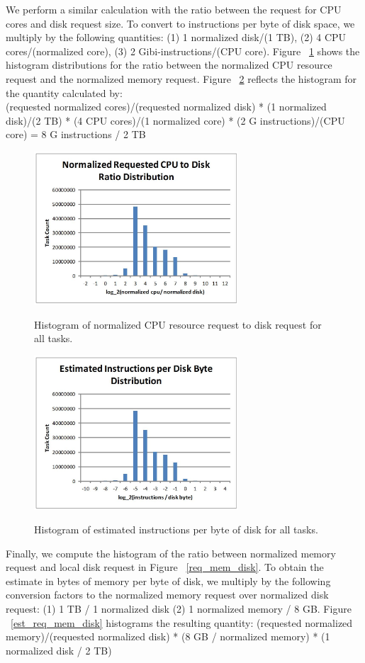\documentclass{sig-alternate}
\begin{document}
We perform a similar calculation with the ratio between the request for CPU cores and disk request size.
To convert to instructions per byte of disk space, we multiply by the following quantities: (1) 1 normalized disk/(1 TB), (2) 4 CPU cores/(normalized core), (3) 2 Gibi-instructions/(CPU core).
Figure ~\ref{req_cpu_disk} shows the histogram distributions for the ratio between the normalized CPU resource request and the normalized memory request.
Figure ~\ref{est_req_cpu_disk} reflects the histogram for the quantity calculated by: \\
(requested normalized cores)/(requested normalized disk) * (1 normalized disk)/(2 TB) * (4 CPU cores)/(1 normalized core) * (2 G instructions)/(CPU core) = 8 G instructions / 2 TB

\begin{figure}[t]
\centering
\includegraphics[width=3in]{../figures/req_cpu_disk.jpg}
\label{req_cpu_disk}
\caption{Histogram of normalized CPU resource request to disk request for all tasks.}
\end{figure}

\begin{figure}[t]
\centering
\includegraphics[width=3in]{../figures/est_req_cpu_disk.jpg}
\label{est_req_cpu_disk}
\caption{Histogram of estimated instructions per byte of disk for all tasks.}
\end{figure}

Finally, we compute the histogram of the ratio between normalized memory request and local disk request in Figure ~\ref{req_mem_disk}.
To obtain the estimate in bytes of memory per byte of disk, we multiply by the following conversion factors to the normalized memory request over normalized disk request: (1) 1 TB / 1 normalized disk (2) 1 normalized memory / 8 GB.
Figure ~\ref{est_req_mem_disk} histograms the resulting quantity:
(requested normalized memory)/(requested normalized disk) * (8 GB / normalized memory) * (1 normalized disk / 2 TB)
\end{document}
